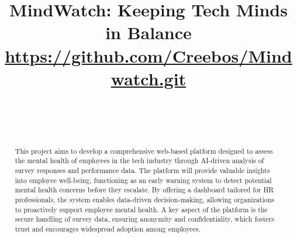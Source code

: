 \documentclass[conference]{IEEEtran}
\begin{document}
\title{MindWatch: Keeping Tech Minds in Balance\\
{\footnotesize \textsuperscript{}\href{https://github.com/Creebos/Mindwatch.git}{https://github.com/Creebos/Mindwatch.git}}
}

\author{
\\
\and
{}
\\
}

\maketitle

\begin{abstract}
    This project aims to develop a comprehensive web-based
    platform designed to assess the mental health of employees in
    the tech industry through AI-driven analysis of survey
    responses and performance data. The platform will provide
    valuable insights into employee well-being, functioning as an
    early warning system to detect potential mental health concerns
    before they escalate. By offering a dashboard tailored for HR
    professionals, the system enables data-driven decision-making,
    allowing organizations to proactively support employee mental
    health. A key aspect of the platform is the secure handling of
    survey data, ensuring anonymity and confidentiality, which
    fosters trust and encourages widespread adoption among
    employees.
\end{abstract}
\end{document}
